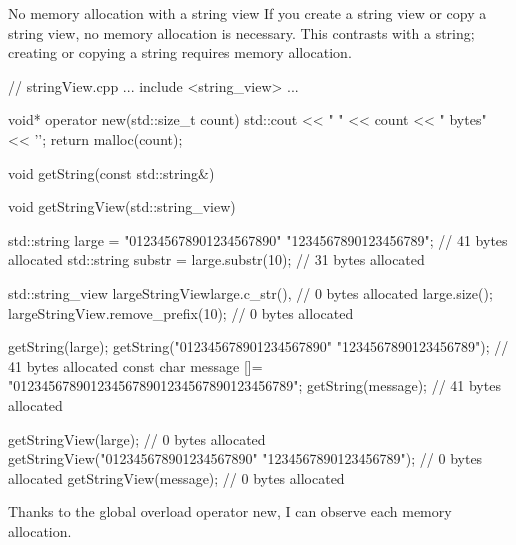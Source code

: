 \begin{myTip}{No memory allocation with a string view}
If you create a string view or copy a string view, no memory allocation is necessary. This contrasts with a string; creating or copying a string requires memory allocation.


\begin{cpp}
// stringView.cpp
...
include <string_view>
...

void* operator new(std::size_t count){
	std::cout << " " << count << " bytes" << '\n';
	return malloc(count);
}

void getString(const std::string&){}

void getStringView(std::string_view){}

std::string large = "012345678901234567890"
					"1234567890123456789"; // 41 bytes allocated
std::string substr = large.substr(10); // 31 bytes allocated

std::string_view largeStringView{large.c_str(), // 0 bytes allocated
								large.size()};
largeStringView.remove_prefix(10); // 0 bytes allocated

getString(large);
getString("012345678901234567890"
		  "1234567890123456789"); // 41 bytes allocated
const char message []= "0123456789012345678901234567890123456789";
getString(message); // 41 bytes allocated

getStringView(large); // 0 bytes allocated
getStringView("012345678901234567890"
			  "1234567890123456789"); // 0 bytes allocated
getStringView(message); // 0 bytes allocated
\end{cpp}

Thanks to the global overload operator new, I can observe each memory allocation.

\end{myTip}
























